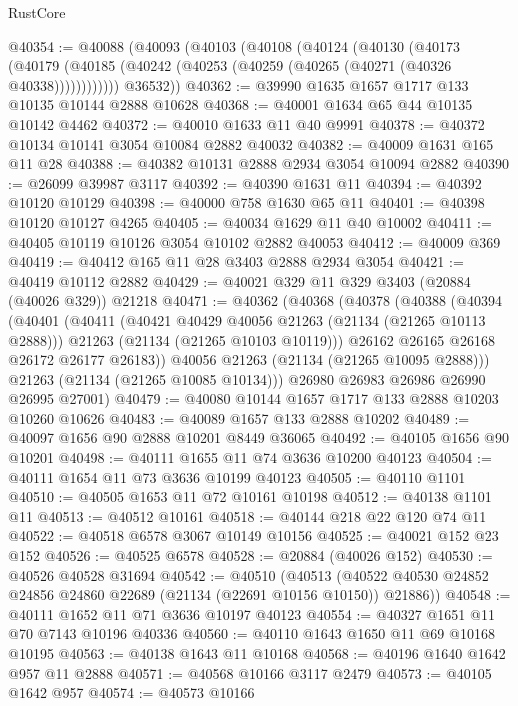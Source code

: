\begin{lexlean}{RustCore}
\begin{coremodule}
@40354 := @40088
    (@40093
      (@40103
        (@40108
          (@40124
            (@40130
              (@40173
                (@40179 (@40185 (@40242 (@40253 (@40259 (@40265 (@40271 (@40326 @40338))))))))))))
        @36532))
@40362 := @39990 @1635 @1657 @1717 @133 @10135 @10144 @2888 @10628
@40368 := @40001 @1634 @65 @44 @10135 @10142 @4462
@40372 := @40010 @1633 @11 @40 @9991
@40378 := @40372 @10134 @10141 @3054 @10084 @2882 @40032
@40382 := @40009 @1631 @165 @11 @28
@40388 := @40382 @10131 @2888 @2934 @3054 @10094 @2882
@40390 := @26099 @39987 @3117
@40392 := @40390 @1631 @11
@40394 := @40392 @10120 @10129
@40398 := @40000 @758 @1630 @65 @11
@40401 := @40398 @10120 @10127 @4265
@40405 := @40034 @1629 @11 @40 @10002
@40411 := @40405 @10119 @10126 @3054 @10102 @2882 @40053
@40412 := @40009 @369
@40419 := @40412 @165 @11 @28 @3403 @2888 @2934 @3054
@40421 := @40419 @10112 @2882
@40429 := @40021 @329 @11 @329 @3403 (@20884 (@40026 @329)) @21218
@40471 := @40362
    (@40368
      (@40378
        (@40388
          (@40394
            (@40401
              (@40411
                (@40421 @40429 @40056 @21263 (@21134 (@21265 @10113 @2888)))
                @21263
                (@21134 (@21265 @10103 @10119)))
              @26162
              @26165
              @26168
              @26172
              @26177
              @26183))
          @40056
          @21263
          (@21134 (@21265 @10095 @2888)))
        @21263
        (@21134 (@21265 @10085 @10134)))
      @26980
      @26983
      @26986
      @26990
      @26995
      @27001)
@40479 := @40080 @10144 @1657 @1717 @133 @2888 @10203 @10260 @10626
@40483 := @40089 @1657 @133 @2888 @10202
@40489 := @40097 @1656 @90 @2888 @10201 @8449 @36065
@40492 := @40105 @1656 @90 @10201
@40498 := @40111 @1655 @11 @74 @3636 @10200 @40123
@40504 := @40111 @1654 @11 @73 @3636 @10199 @40123
@40505 := @40110 @1101
@40510 := @40505 @1653 @11 @72 @10161 @10198
@40512 := @40138 @1101 @11
@40513 := @40512 @10161
@40518 := @40144 @218 @22 @120 @74 @11
@40522 := @40518 @6578 @3067 @10149 @10156
@40525 := @40021 @152 @23 @152
@40526 := @40525 @6578
@40528 := @20884 (@40026 @152)
@40530 := @40526 @40528 @31694
@40542 := @40510
    (@40513 (@40522 @40530 @24852 @24856 @24860 @22689 (@21134 (@22691 @10156 @10150)) @21886))
@40548 := @40111 @1652 @11 @71 @3636 @10197 @40123
@40554 := @40327 @1651 @11 @70 @7143 @10196 @40336
@40560 := @40110 @1643 @1650 @11 @69 @10168 @10195
@40563 := @40138 @1643 @11 @10168
@40568 := @40196 @1640 @1642 @957 @11 @2888
@40571 := @40568 @10166 @3117 @2479
@40573 := @40105 @1642 @957
@40574 := @40573 @10166

\end{coremodule}
\end{lexlean}
